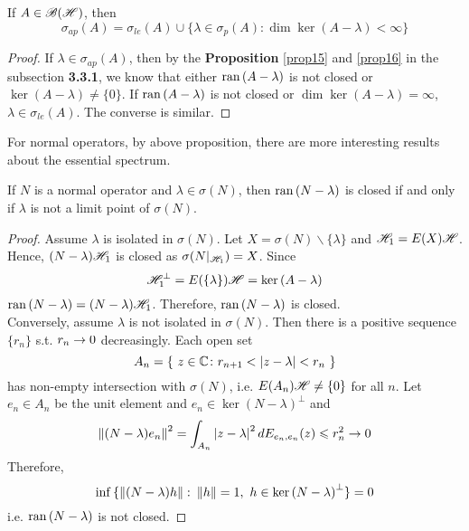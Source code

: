 \begin{prop}
	If $A \in \mathscr{B(H)}$, then
	\begin{equation*}
		\sigma_{ap}(A) = \sigma_{le}(A) \cup \{\lambda \in \sigma_p(A) \colon \dim{\ker{(A-\lambda)}} < \infty\}
	\end{equation*}
\end{prop}
\begin{proof}
	If $\lambda \in \sigma_{ap}(A)$, then by the \textbf{Proposition} \ref{prop15} and \ref{prop16} in the subsection \textbf{3.3.1}, we know that either $\operatorname{ran}{(A-\lambda)}$ is not closed or $\ker{(A-\lambda)} \neq \{0\}$. If $\operatorname{ran}{(A-\lambda)}$ is not closed or $\dim{\ker{(A-\lambda)}} = \infty$, $\lambda \in \sigma_{le}(A)$. The converse is similar.
\end{proof}

For normal operators, by above proposition, there are more interesting results about the essential spectrum.

\begin{lem}
	If $N$ is a normal operator and $\lambda \in \sigma(N)$, then $\operatorname{ran}{(N-\lambda)}$ is closed if and only if $\lambda$ is not a limit point of $\sigma(N)$.
\end{lem}
\begin{proof}
	Assume $\lambda$ is isolated in $\sigma(N)$. Let $X = \sigma(N) \backslash \{\lambda\}$ and $\mathscr{H}_1 = E(X) \mathscr{H}$. Hence, $(N-\lambda)\mathscr{H}_1$ is closed as $\sigma(N|_{\mathscr{H}_1}) = X$. Since
	\begin{equation*}
		\mathscr{H}_1^{\bot} = E(\{\lambda\}) \mathscr{H} = \ker{(A-\lambda)}
	\end{equation*}
	$\operatorname{ran}{(N-\lambda)} = (N-\lambda)\mathscr{H}_1$. Therefore, $\operatorname{ran}{(N-\lambda)}$ is closed. \\
	Conversely, assume $\lambda$ is not isolated in $\sigma(N)$. Then there is a positive sequence $\{r_n\}$ s.t. $r_n \rightarrow 0$ decreasingly. Each open set
	\begin{equation*}
		A_n = \{~z \in \mathbb{C} \colon r_{n+1} < \left\lvert z - \lambda\right\lvert < r_n~\}
	\end{equation*}
	has non-empty intersection with $\sigma(N)$, i.e. $E(A_n)\mathscr{H} \neq \{0\}$ for all $n$. Let $e_n \in A_n$ be the unit element and $e_n \in \ker{(N-\lambda)}^{\bot}$ and
	\begin{equation*}
		\left\lVert(N-\lambda)e_n\right\lVert^2 = \int_{A_n} \left\lvert z-\lambda\right\lvert^2 d E_{e_n,e_n}(z) \leqslant r_n^2 \rightarrow 0
	\end{equation*}
	Therefore,
	\begin{equation*}
		\inf{\{\left\lVert(N-\lambda)h\right\lVert \colon \left\lVert h\right\lVert = 1,~h \in \ker{(N-\lambda)}^{\bot}\}} = 0
	\end{equation*}
	i.e. $\operatorname{ran}{(N-\lambda)}$ is not closed.
\end{proof}

